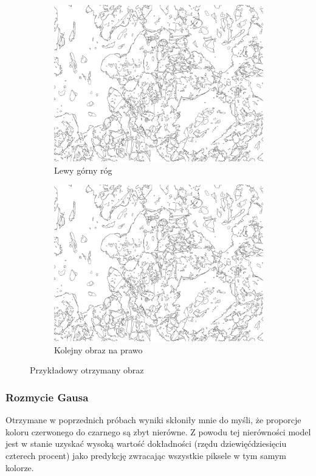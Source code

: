 \documentclass{article}
\begin{document}
\begin{figure}[H]
    \centering
    \begin{subfigure}{0.4\linewidth}
        \includegraphics[width=\linewidth]{images/output.jpg}
        \caption{Lewy górny róg}
    \end{subfigure}
    \begin{subfigure}{0.4\linewidth}
        \includegraphics[width=\linewidth]{images/output.jpg}
        \caption{Kolejny obraz na prawo}
    \end{subfigure}
    \caption{Przykładowy otrzymany obraz}
    \label{fig:input_split}
\end{figure}

\subsubsection{Rozmycie Gausa}
Otrzymane w poprzednich próbach wyniki skłoniły mnie do myśli, że proporcje koloru czerwonego do czarnego są zbyt nierówne.
Z powodu tej nierówności model jest w stanie uzyskać wysoką wartość dokładności (rzędu dziewięćdziesięciu czterech procent) jako predykcję zwracając wszystkie piksele w tym samym kolorze.
\end{document}
